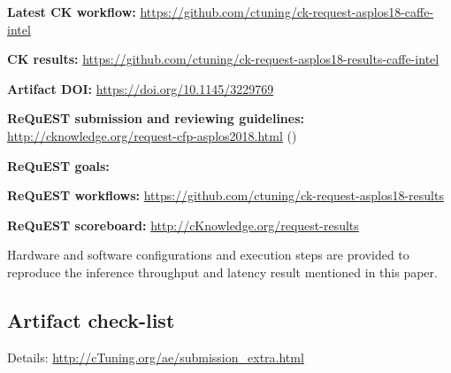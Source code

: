 \documentclass[sigplan]{acmart}
\newenvironment{packed_itemize}{
\begin{itemize}
  \setlength{\itemsep}{1pt}
  \setlength{\parskip}{0pt}
  \setlength{\parsep}{0pt}
}{\end{itemize}}
\begin{document}
\begin{packed_itemize}
  \item {\bf Latest CK workflow:} \url{https://github.com/ctuning/ck-request-asplos18-caffe-intel}
  \item {\bf CK results:} \url{https://github.com/ctuning/ck-request-asplos18-results-caffe-intel}
  \item {\bf Artifact DOI:} \url{https://doi.org/10.1145/3229769}
  \item {\bf ReQuEST submission and reviewing guidelines:} \url{http://cknowledge.org/request-cfp-asplos2018.html} (\cite{request-asplos18})
  \item {\bf ReQuEST goals:} \cite{cm:29db2248aba45e59:0c7348dfbadd5b95}
  \item {\bf ReQuEST workflows:} \url{https://github.com/ctuning/ck-request-asplos18-results}
  \item {\bf ReQuEST scoreboard:} \url{http://cKnowledge.org/request-results}
\end{packed_itemize}

Hardware and software configurations and execution steps are
provided to reproduce the inference throughput and latency
result mentioned in this paper.

\subsection{Artifact check-list}

Details: \url{http://cTuning.org/ae/submission_extra.html}
\end{document}
